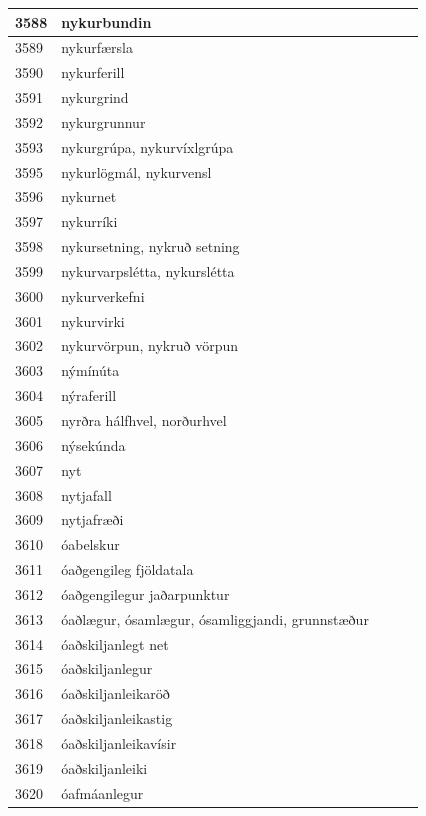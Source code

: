 \begin{longtable}{p{}|p{}|p{}|p{}|p{}}
3588 & nykurbundin &  &  &  \\
\hline
3589 & nykurfærsla &  &  &  \\
\hline
3590 & nykurferill &  &  &  \\
\hline
3591 & nykurgrind &  &  &  \\
\hline
3592 & nykurgrunnur &  &  &  \\
\hline
3593 & nykurgrúpa, nykurvíxlgrúpa &  &  &  \\
\hline
3595 & nykurlögmál, nykurvensl &  &  &  \\
\hline
3596 & nykurnet &  &  &  \\
\hline
3597 & nykurríki &  &  &  \\
\hline
3598 & nykursetning, nykruð setning &  &  &  \\
\hline
3599 & nykurvarpslétta, nykurslétta &  &  &  \\
\hline
3600 & nykurverkefni &  &  &  \\
\hline
3601 & nykurvirki &  &  &  \\
\hline
3602 & nykurvörpun, nykruð vörpun &  &  &  \\
\hline
3603 & nýmínúta &  &  &  \\
\hline
3604 & nýraferill &  &  &  \\
\hline
3605 & nyrðra hálfhvel, norðurhvel &  &  &  \\
\hline
3606 & nýsekúnda &  &  &  \\
\hline
3607 & nyt &  &  &  \\
\hline
3608 & nytjafall &  &  &  \\
\hline
3609 & nytjafræði &  &  &  \\
\hline
3610 & óabelskur &  &  &  \\
\hline
3611 & óaðgengileg fjöldatala &  &  &  \\
\hline
3612 & óaðgengilegur jaðarpunktur &  &  &  \\
\hline
3613 & óaðlægur, ósamlægur, ósamliggjandi, grunnstæður &  &  &  \\
\hline
3614 & óaðskiljanlegt net &  &  &  \\
\hline
3615 & óaðskiljanlegur &  &  &  \\
\hline
3616 & óaðskiljanleikaröð &  &  &  \\
\hline
3617 & óaðskiljanleikastig &  &  &  \\
\hline
3618 & óaðskiljanleikavísir &  &  &  \\
\hline
3619 & óaðskiljanleiki &  &  &  \\
\hline
3620 & óafmáanlegur &  &  &  \\

\end{longtable}
